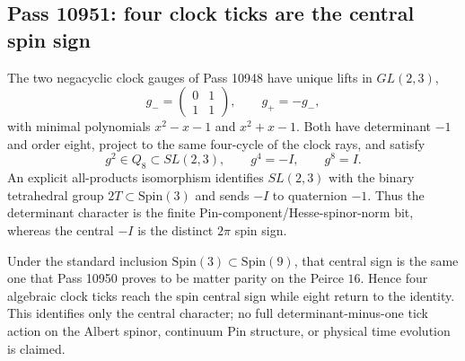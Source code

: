 \subsection{Pass 10951: four clock ticks are the central spin sign}

The two negacyclic clock gauges of Pass 10948 have unique lifts in
$GL(2,3)$,
\[
 g_- = \begin{pmatrix}0&1\\1&1\end{pmatrix},
 \qquad
 g_+ = -g_-,
\]
with minimal polynomials $x^2-x-1$ and $x^2+x-1$.  Both have determinant
$-1$ and order eight, project to the same four-cycle of the clock rays, and
satisfy
\[
 g^2\in Q_8\subset SL(2,3),\qquad g^4=-I,\qquad g^8=I.
\]
An explicit all-products isomorphism identifies
$SL(2,3)$ with the binary tetrahedral group
$2T\subset\mathrm{Spin}(3)$ and sends $-I$ to quaternion $-1$.
Thus the determinant character is the finite Pin-component/Hesse-spinor-norm
bit, whereas the central $-I$ is the distinct $2\pi$ spin sign.

Under the standard inclusion $\mathrm{Spin}(3)\subset\mathrm{Spin}(9)$,
that central sign is the same one that Pass 10950 proves to be matter parity
on the Peirce $16$.  Hence four algebraic clock ticks reach the spin central
sign while eight return to the identity.  This identifies only the central
character; no full determinant-minus-one tick action on the Albert spinor,
continuum Pin structure, or physical time evolution is claimed.
